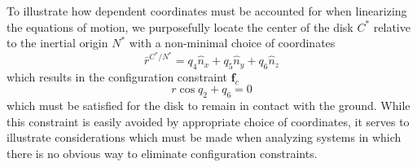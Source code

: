 \documentclass[smallcondensed,final]{svjour3}                     %
\begin{document}
To illustrate how dependent coordinates must be
accounted for when linearizing the equations of motion, we purposefully locate
the center of the disk $C^*$ relative to the inertial origin $N^*$ with a
non-minimal choice of coordinates
\begin{equation*}
  \bar{r}^{C^*/N^*} = q_4 \hat{n}_x + q_5 \hat{n}_y + q_6 \hat{n}_z
\end{equation*}
which results in the configuration constraint $\mathbf{f}_c$
\begin{equation}
  \label{rd:f_c}
  r\cos{q_2} + q_6 = 0
\end{equation}
which must be satisfied for the disk to remain in contact with the ground.
While this constraint is easily avoided by appropriate choice of coordinates,
it serves to illustrate considerations which must be made when analyzing
systems in which there is no obvious way to eliminate configuration constraints.
\end{document}
